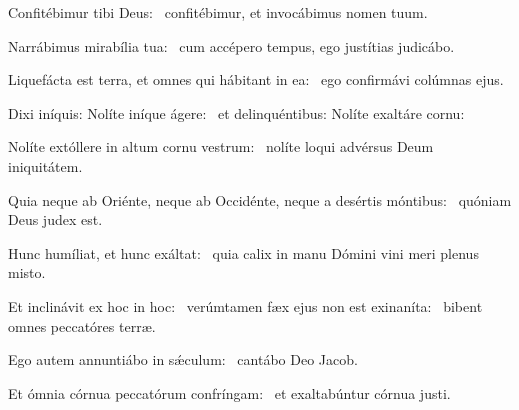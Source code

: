 \item Confitébimur tibi Deus:~\psstar{} confitébimur, et invocábimus nomen tuum.

\item Narrábimus mirabília tua:~\psstar{} cum accépero tempus, ego justítias judicábo.

\item Liquefácta est terra, et omnes qui hábitant in ea:~\psstar{} ego confirmávi colúmnas ejus.

\item Dixi iníquis: Nolíte iníque ágere:~\psstar{} et delinquéntibus: Nolíte exaltáre cornu:

\item Nolíte extóllere in altum cornu vestrum:~\psstar{} nolíte loqui advérsus Deum iniquitátem.

\item Quia neque ab Oriénte, neque ab Occidénte, neque a desértis móntibus:~\psstar{} quóniam Deus judex est.

\item Hunc humíliat, et hunc exáltat:~\psstar{} quia calix in manu Dómini vini meri plenus misto.

\item Et inclinávit ex hoc in hoc:~\pscross{} verúmtamen fæx ejus non est exinaníta:~\psstar{} bibent omnes peccatóres terræ.

\item Ego autem annuntiábo in sǽculum:~\psstar{} cantábo Deo Jacob.

\item Et ómnia córnua peccatórum confríngam:~\psstar{} et exaltabúntur córnua justi.
